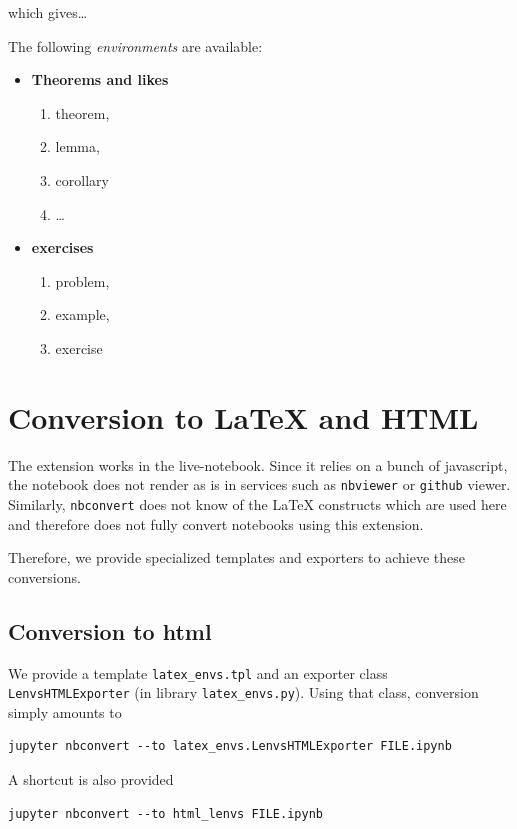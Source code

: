     which gives\ldots{}

The following \textit{environments} are available:
\begin{itemize}
\item
\textbf{Theorems and likes}
\begin{enumerate}
\item
theorem,
\item lemma,
\item corollary
\item
\ldots{}
\end{enumerate}
\item
\textbf{exercises}
\begin{enumerate}
\item
problem,
\item example,
\item
exercise
\end{enumerate}
\end{itemize}

    \section{Conversion to LaTeX and
HTML}\label{conversion-to-latex-and-html}

    The extension works in the live-notebook. Since it relies on a bunch of
javascript, the notebook does not render as is in services such as
\texttt{nbviewer} or \texttt{github} viewer. Similarly,
\texttt{nbconvert} does not know of the LaTeX constructs which are used
here and therefore does not fully convert notebooks using this
extension.

Therefore, we provide specialized templates and exporters to achieve
these conversions.

    \subsection{Conversion to html}\label{conversion-to-html}

We provide a template \texttt{latex\_envs.tpl} and an exporter class
\texttt{LenvsHTMLExporter} (in library \texttt{latex\_envs.py}). Using
that class, conversion simply amounts to

\begin{verbatim}
jupyter nbconvert --to latex_envs.LenvsHTMLExporter FILE.ipynb
\end{verbatim}

A shortcut is also provided

\begin{verbatim}
jupyter nbconvert --to html_lenvs FILE.ipynb
\end{verbatim}

